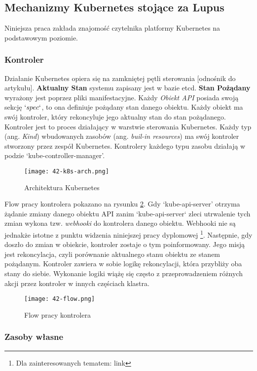 \subsection{Mechanizmy Kubernetes stojące za Lupus}
Niniejsza praca zakłada znajomość czytelnika platformy Kubernetes na podstawowym poziomie.

\subsubsection{Kontroler}
Działanie Kubernetes opiera się na zamkniętej pętli sterowania [odnośnik do artykułu]. \textbf{Aktualny Stan} systemu zapisany jest w bazie etcd. \textbf{Stan Pożądany} wyrażony jest poprzez pliki manifestacyjne. Każdy \textit{Obiekt API} posiada swoją sekcję $`spec`$, to ona definiuje pożądany stan danego obiektu. Każdy obiekt ma swój kontroler, który rekoncyluje jego aktualny stan do stan pożądanego. Kontroler jest to proces działający w warstwie sterowania Kubernetes. Każdy typ (ang. \textit{Kind}) wbudowanych zasobów (ang. \textit{buil-in resources}) ma swój kontroler stworzony przez zespół Kubernetes. Kontrolery każdego typu zasobu działają w podzie `kube-controller-manager'. 

\begin{figure}[!h]
    \centering \texttt{[image: 42-k8s-arch.png]}
    \caption{Architektura Kubernetes}\label{fig:42-k8s-arch}
\end{figure}

Flow pracy kontrolera pokazano na rysunku \ref{fig:42-flow}. Gdy `kube-api-server' otrzyma żądanie zmiany danego obiektu API zanim `kube-api-server` zleci utrwalenie tych zmian wykona tzw. \textit{webhooki} do kontrolera danego obiektu. Webhooki nie są jednakże istotne z punktu widzenia niniejszej pracy dyplomowej \footnote{Dla zainteresowanych tematem: link}. Następnie, gdy doszło do zmian w obiekcie, kontroler zostaje o tym poinformowany. Jego misją jest rekoncylacja, czyli porównanie aktualnego stanu obiektu ze stanem pożądanym. Kontroler zawiera w sobie logikę rekoncylacji, która przybliży oba stany do siebie. Wykonanie logiki wiążę się często z przeprowadzeniem różnych akcji przez kontroler w innych częściach klastra. 

\begin{figure}[!h]
    \centering \texttt{[image: 42-flow.png]}
    \caption{Flow pracy kontrolera}\label{fig:42-flow}
\end{figure}

\subsubsection{Zasoby własne} 

